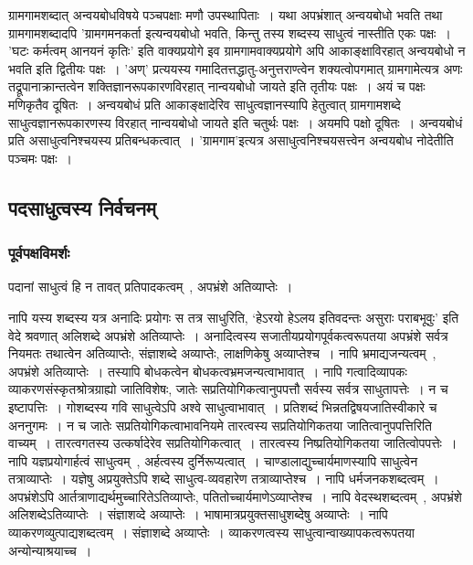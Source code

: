 				ग्रामगामशब्दात् अन्वयबोधविषये पञ्चपक्षाः मणौ उपस्थापिताः~। यथा अपभ्रंशात् अन्वयबोधो भवति तथा ग्रामगामशब्दादपि ’ग्रामगमनकर्ता इत्यन्वयबोधो भवति, किन्तु तस्य शब्दस्य साधुत्वं नास्तीति एकः पक्षः~। ’घटः कर्मत्वम् आनयनं कृतिः’ इति वाक्यप्रयोगे इव ग्रामगामवाक्यप्रयोगे अपि आकाङ्क्षाविरहात् अन्वयबोधो न भवति इति द्वितीयः पक्षः~। ’अण्’ प्रत्ययस्य गमादितत्तद्धातु-अनुत्तराण्त्वेन शक्यत्वोपगमात् ग्रामगामेत्यत्र अणः तद्रूपानाक्रान्तत्वेन शक्तिज्ञानरूपकारणविरहात् नान्वयबोधो जायते इति तृतीयः पक्षः~। अयं च पक्षः मणिकृतैव दूषितः~। अन्वयबोधं प्रति आकाङ्क्षादेरिव साधुत्वज्ञानस्यापि हेतुत्वात् ग्रामगामशब्दे साधुत्वज्ञानरूपकारणस्य विरहात् नान्वयबोधो जायते इति चतुर्थः पक्षः~। अयमपि पक्षो दूषितः~। अन्वयबोधं प्रति असाधुत्वनिश्चयस्य प्रतिबन्धकत्वात्~। 'ग्रामगाम'इत्यत्र असाधुत्वनिश्चयसत्त्वेन अन्वयबोध नोदेतीति पञ्चमः पक्षः~।
			
		\subsection{पदसाधुत्वस्य निर्वचनम्}
	
			\subsubsection{पूर्वपक्षविमर्शः}
			
				पदानां साधुत्वं हि न तावत् प्रतिपादकत्वम्~, अपभ्रंशे अतिव्याप्तेः~। 

				नापि यस्य शब्दस्य यत्र अनादिः प्रयोगः स तत्र साधुरिति, ‘हेऽरयो हेऽलय इतिवदन्तः असुराः पराबभूवुः’ इति वेदे श्रवणात्  अलिशब्दे अपभ्रंशे अतिव्याप्तेः~। अनादित्वस्य सजातीयप्रयोगपूर्वकत्वरूपतया अपभ्रंशे सर्वत्र नियमतः तथात्वेन अतिव्याप्तेः, संज्ञाशब्दे अव्याप्तेः, लाक्षणिकेषु अव्याप्तेश्च~। नापि भ्रमाद्यजन्यत्वम्~, अपभ्रंशे अतिव्याप्तेः~। तस्यापि बोधकत्वेन बोधकत्वभ्रमजन्यत्वाभावात्~। नापि गत्वादिव्यापकः व्याकरणसंस्कृतश्रोत्रग्राह्यो जातिविशेषः, जातेः सप्रतियोगिकत्वानुपपत्तौ सर्वस्य सर्वत्र साधुतापत्तेः~। न च इष्टापत्तिः~। गोशब्दस्य गवि साधुत्वेऽपि अश्वे साधुत्वाभावात्~। प्रतिशब्दं भिन्नतद्विषयजातिस्वीकारे च अननुगमः~। न च जातेः सप्रतियोगिकत्वाभावनियमे तारत्वस्य सप्रतियोगिकतया जातित्वानुपपत्तिरिति वाच्यम्~। तारत्वगतस्य उत्कर्षादेरेव सप्रतियोगिकत्वात्~। तारत्वस्य निष्प्रतियोगिकतया जातित्वोपपत्तेः~। नापि यज्ञप्रयोगार्हत्वं साधुत्वम्~, अर्हत्वस्य दुर्निरूप्यत्वात्~। चाण्डालाद्युच्चार्यमाणस्यापि साधुत्वेन तत्राव्याप्तेः~। यज्ञेषु अप्रयुक्तेऽपि शब्दे साधुत्व-व्यवहारेण तत्राव्याप्तेश्च~। नापि    धर्मजनकशब्दत्वम्~। अपभ्रंशेऽपि आर्तत्राणाद्यर्थमुच्चारितेऽतिव्याप्तेः, पतितोच्चार्यमाणेऽव्याप्तेश्च~। नापि वेदस्थशब्दत्वम्~, अपभ्रंशे अलिशब्देऽतिव्याप्तेः~। संज्ञाशव्दे अव्याप्तेः~। भाषामात्रप्रयुक्तसाधुशब्देषु अव्याप्तेः~। नापि व्याकरणव्युत्पाद्यशब्दत्वम्~। संज्ञाशब्दे अव्याप्तेः~। व्याकरणत्वस्य साधुत्वान्वाख्यापकत्वरूपतया अन्योन्याश्रयाच्च~।

